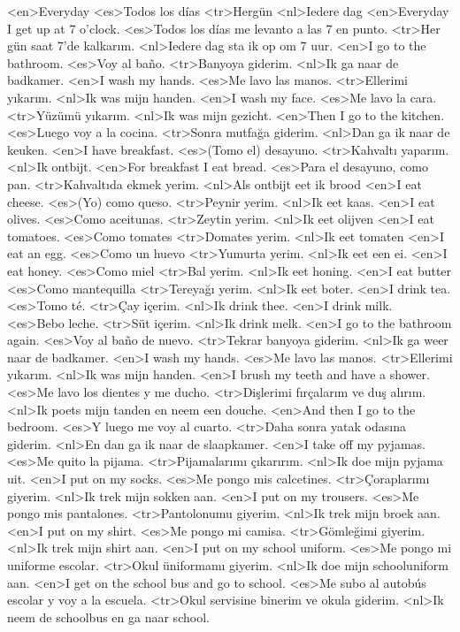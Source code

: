 <en>Everyday
<es>Todos los días
<tr>Hergün
<nl>Iedere dag
<en>Everyday I get up at 7 o’clock.
<es>Todos los días me levanto a las 7 en punto.
<tr>Her gün saat 7’de kalkarım.
<nl>Iedere dag sta ik op om 7 uur.
<en>I go to the bathroom.
<es>Voy al baño.
<tr>Banyoya giderim.
<nl>Ik ga naar de badkamer.
<en>I wash my hands.
<es>Me lavo las manos.
<tr>Ellerimi yıkarım.
<nl>Ik was mijn handen.
<en>I wash my face.
<es>Me lavo la cara.
<tr>Yüzümü yıkarım.
<nl>Ik was mijn gezicht.
<en>Then I go to the kitchen.
<es>Luego voy a la cocina.
<tr>Sonra mutfağa giderim.
<nl>Dan ga ik naar de keuken.
<en>I have breakfast.
<es>(Tomo el) desayuno.
<tr>Kahvaltı yaparım.
<nl>Ik ontbijt.
<en>For breakfast I eat bread.
<es>Para el desayuno, como pan.
<tr>Kahvaltıda ekmek yerim.
<nl>Als ontbijt eet ik brood
<en>I eat cheese.
<es>(Yo) como queso.
<tr>Peynir yerim.
<nl>Ik eet kaas.
<en>I eat olives.
<es>Como aceitunas.
<tr>Zeytin yerim.
<nl>Ik eet olijven
<en>I eat tomatoes.
<es>Como tomates
<tr>Domates yerim.
<nl>Ik eet tomaten
<en>I eat an egg.
<es>Como un huevo
<tr>Yumurta yerim.
<nl>Ik eet een ei.
<en>I eat honey.
<es>Como miel
<tr>Bal yerim.
<nl>Ik eet honing.
<en>I eat butter
<es>Como mantequilla
<tr>Tereyağı  yerim.
<nl>Ik eet boter.
<en>I drink tea.
<es>Tomo té.
<tr>Çay içerim.
<nl>Ik drink thee.
<en>I drink milk.
<es>Bebo leche.
<tr>Süt içerim.
<nl>Ik drink melk.
<en>I go to the bathroom again.
<es>Voy al baño de nuevo.
<tr>Tekrar banyoya giderim.
<nl>Ik ga weer naar de badkamer.
<en>I wash my hands.
<es>Me lavo las manos.
<tr>Ellerimi yıkarım.
<nl>Ik was mijn handen.
<en>I brush my teeth and have a shower.
<es>Me lavo los dientes y me ducho.
<tr>Dişlerimi fırçalarım ve duş alırım.
<nl>Ik poets mijn tanden en neem een douche.
<en>And then I go to the bedroom.
<es>Y luego me voy al cuarto.
<tr>Daha sonra yatak odasına giderim.
<nl>En dan ga ik naar de slaapkamer.
<en>I take off my pyjamas.
<es>Me quito la pijama.
<tr>Pijamalarımı çıkarırım.
<nl>Ik doe mijn pyjama uit.
<en>I put on my socks.
<es>Me pongo mis calcetines.
<tr>Çoraplarımı giyerim.
<nl>Ik trek mijn sokken aan.
<en>I put on my trousers.
<es>Me pongo mis pantalones.
<tr>Pantolonumu giyerim.
<nl>Ik trek mijn broek aan.
<en>I put on my shirt.
<es>Me pongo mi camisa.
<tr>Gömleğimi giyerim.
<nl>Ik trek mijn shirt aan.
<en>I put on my school uniform.
<es>Me pongo mi uniforme escolar.
<tr>Okul üniformamı giyerim.
<nl>Ik doe mijn schooluniform aan.
<en>I get on the school bus and go to school.
<es>Me subo al autobús escolar y voy a la escuela.
<tr>Okul servisine binerim ve okula giderim.
<nl>Ik neem de schoolbus en ga naar school.
